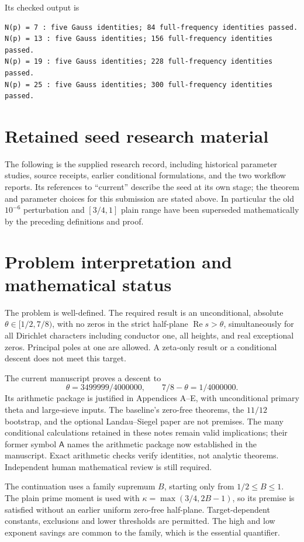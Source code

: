 \documentclass[12pt]{article}
\newcommand{\Rea}{\operatorname{Re}}
\begin{document}
Its checked output is
\begin{verbatim}
N(p) = 7 : five Gauss identities; 84 full-frequency identities passed.
N(p) = 13 : five Gauss identities; 156 full-frequency identities passed.
N(p) = 19 : five Gauss identities; 228 full-frequency identities passed.
N(p) = 25 : five Gauss identities; 300 full-frequency identities passed.
\end{verbatim}

\section{Retained seed research material}
The following is the supplied research record, including historical
parameter studies, source receipts, earlier conditional formulations,
and the two workflow reports.  Its references to ``current'' describe
the seed at its own stage; the theorem and parameter choices for this
submission are stated above.  In particular the old \(10^{-6}\)
perturbation and \([3/4,1]\) plain range have been superseded
mathematically by the preceding definitions and proof.



\section{Problem interpretation and mathematical status}
The problem is well-defined.  The required result is an unconditional,
absolute \(\theta\in[1/2,7/8)\), with no zeros in the strict half-plane
\(\Rea s>\theta\), simultaneously for all Dirichlet characters
including conductor one, all heights, and real exceptional zeros.
Principal poles at one are allowed.  A zeta-only result or a
conditional descent does not meet this target.

The current manuscript proves a descent to
\[
 \theta=3499999/4000000,\qquad 7/8-\theta=1/4000000.
\]
Its arithmetic package is justified in Appendices A--E, with
unconditional primary theta and large-sieve inputs.
The baseline's zero-free theorems, the \(11/12\) bootstrap, and
the optional Landau--Siegel paper are not premises.
The many conditional calculations retained in these notes remain
valid implications; their former symbol \(\mathsf A\) names the
arithmetic package now established in the manuscript.
Exact arithmetic checks verify identities, not analytic theorems.
Independent human mathematical review is still required.

The continuation uses a family supremum \(B\), starting only from
\(1/2\le B\le1\).  The plain prime moment is used with
\(\kappa=\max(3/4,2B-1)\), so its premise is satisfied
without an earlier uniform zero-free half-plane.
Target-dependent constants, exclusions and lower thresholds are
permitted.  The high and low exponent savings are common to the
family, which is the essential quantifier.
\end{document}
